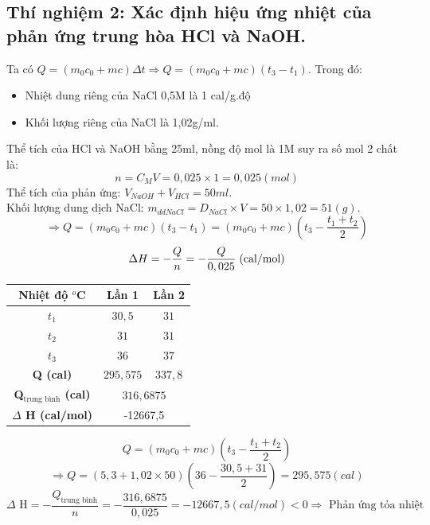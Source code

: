 \documentclass[12pt,a4paper]{report}
\begin{document}
\subsection*{Thí nghiệm 2: Xác định hiệu ứng nhiệt của phản ứng trung hòa HCl và NaOH.}
Ta có $Q = (m_0c_0 + mc)\Delta t \Rightarrow Q = (m_0c_0 + mc)(t_3 - t_1)$. Trong đó:
\begin{itemize}
    \item Nhiệt dung riêng của NaCl 0,5M là 1 cal/g.độ
    \item Khối lượng riêng của NaCl là 1,02g/ml.
\end{itemize}
Thể tích của HCl và NaOH bằng 25ml, nồng độ mol là 1M suy ra số mol 2 chất là:
\[ 
    n = C_M V = 0,025 \times 1 = 0,025 (mol)    
\]
Thể tích của phản ứng: $V_{NaOH} + V_{HCl} = 50ml$.\\
Khối lượng dung dịch NaCl: $m_{ddNaCl} = D_{NaCl} \times V = 50 \times 1,02 = 51(g)$.
\[
    \Rightarrow Q = (m_0c_0 + mc)(t_3 - t_1) = (m_0c_0 + mc)\left(t_3 - \dfrac{t_1 + t_2}{2}\right)
\]
\[
    \Delta H = - \frac{Q}{n} = -\frac{Q}{0,025} \thickspace \text{(cal/mol)}
\]
\begin{table}[h!]
    \centering
    \begin{tabular}{|c|cc|}
    \hline
    \textbf{Nhiệt độ $^o$C}              & \multicolumn{1}{c|}{\textbf{Lần 1}} & \textbf{Lần 2} \\ \hline
    \textbf{$t_1$}                       & \multicolumn{1}{c|}{$30,5$}         & $31$           \\ \hline
    \textbf{$t_2$}                       & \multicolumn{1}{c|}{$31$}           & $31$           \\ \hline
    \textbf{$t_3$}                       & \multicolumn{1}{c|}{$36$}           & $37$           \\ \hline
    \textbf{Q (cal)}                     & \multicolumn{1}{c|}{$295,575$}      & $337,8$        \\ \hline
    \textbf{Q$_\text{trung bình}$ (cal)} & \multicolumn{2}{c|}{$316,6875$}                      \\ \hline
    \textbf{$\Delta$ H (cal/mol)}        & \multicolumn{2}{c|}{-12667,5}                        \\ \hline
    \end{tabular}
    \end{table}
\[
    Q = (m_0c_0 + mc)\left(t_3 - \frac{t_1 + t_2}{2}\right)
\]
\[
   \Rightarrow Q= (5,3 + 1,02\times 50)\left(36-\frac{30,5+31}{2}\right) = 295,575 (cal)
\]
\[
    \Delta \text{ H} = -\frac{Q_\text{trung bình}}{n} = - \frac{316,6875}{0,025} = -12667,5 (cal/mol) < 0 \Rightarrow \text{ Phản ứng tỏa nhiệt}
\]
\end{document}
